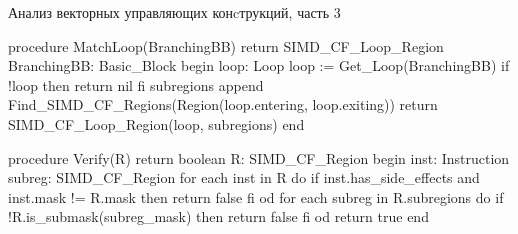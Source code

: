 \begin{ListingEnv}[!h]
    \captiondelim{ } 
    \caption{Анализ векторных управляющих конcтрукций, часть 3}
    \begin{Verb}
procedure MatchLoop(BranchingBB) return SIMD_CF_Loop_Region
  BranchingBB: Basic_Block
begin
  loop: Loop
  loop := Get_Loop(BranchingBB)
  if !loop then
    return nil
  fi
  subregions append Find_SIMD_CF_Regions(Region(loop.entering, loop.exiting))
  return SIMD_CF_Loop_Region(loop, subregions)
end

procedure Verify(R) return boolean
  R: SIMD_CF_Region
begin
  inst: Instruction
  subreg: SIMD_CF_Region
  for each inst in R do
    if inst.has_side_effects and inst.mask != R.mask then
      return false     
    fi
  od
  for each subreg in R.subregions do
    if !R.is_submask(subreg_mask) then
      return false
    fi
  od
  return true
end
    \end{Verb}
\end{ListingEnv}
